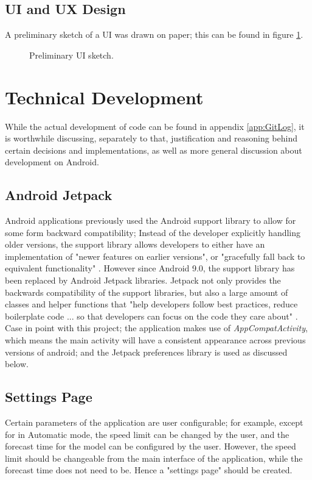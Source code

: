 \documentclass[11pt, a4paper, notitlepage]{report}
\begin{document}
\section{UI and UX Design}
A preliminary sketch of a UI was drawn on paper; this can be found in figure \ref{fig:UIPage}.
\begin{figure}
	\centering
	\caption{Preliminary UI sketch.}
	\label{fig:UIPage}
\end{figure}

\chapter{Technical Development}\label{ch:TechDev}
While the actual development of code can be found in appendix \ref{app:GitLog}, it is worthwhile discussing, separately to that, justification and reasoning behind certain decisions and implementations, as well as more general discussion about development on Android.

\section{Android Jetpack}
Android applications previously used the Android support library to allow for some form backward compatibility; Instead of the developer explicitly handling older versions, the support library allows developers to either have an implementation of "newer features on earlier versions", or "gracefully fall back to equivalent functionality" \citep{supportLibAndroid}. However since Android 9.0, the support library has been replaced by Android Jetpack libraries. Jetpack not only provides the backwards compatibility of the support libraries, but also a large amount of classes and helper functions that "help developers follow best practices, reduce boilerplate code ... so that developers can focus on the code they care about" \citep{AndroidJetpack}. Case in point with this project; the application makes use of \textit{AppCompatActivity}, which means the main activity will have a consistent appearance across previous versions of android; and the Jetpack preferences library is used as discussed below.

\section{Settings Page}
Certain parameters of the application are user configurable; for example, except for in Automatic mode, the speed limit can be changed by the user, and the forecast time for the model can be configured by the user. However, the speed limit should be changeable from the main interface of the application, while the forecast time does not need to be. Hence a "settings page" should be created.
\end{document}
